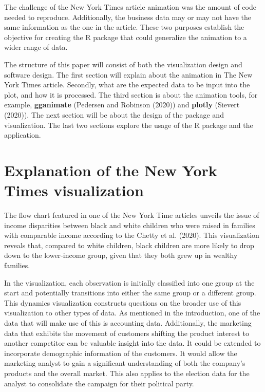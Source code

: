 The challenge of the New York Times article animation was the amount of code needed to reproduce. Additionally, the business data may or may not have the same information as the one in the article. These two purposes establish the objective for creating the R package that could generalize the animation to a wider range of data.

The structure of this paper will consist of both the visualization design and software design. The first section will explain about the animation in The New York Times article. Secondly, what are the expected data to be input into the plot, and how it is processed. The third section is about the animation tools, for example, \textbf{gganimate} (Pedersen and Robinson (2020)) and \textbf{plotly} (Sievert (2020)). The next section will be about the design of the package and visualization. The last two sections explore the usage of the R package and the application.

\hypertarget{explanation-of-the-new-york-times-visualization}{%
\section{Explanation of the New York Times visualization}\label{explanation-of-the-new-york-times-visualization}}

The flow chart featured in one of the New York Time articles unveils the issue of income disparities between black and white children who were raised in families with comparable income according to the Chetty et al. (2020). This visualization reveals that, compared to white children, black children are more likely to drop down to the lower-income group, given that they both grew up in wealthy families.

In the visualization, each observation is initially classified into one group at the start and potentially transitions into either the same group or a different group. This dynamics visualization constructs questions on the broader use of this visualization to other types of data. As mentioned in the introduction, one of the data that will make use of this is accounting data. Additionally, the marketing data that exhibits the movement of customers shifting the product interest to another competitor can be valuable insight into the data. It could be extended to incorporate demographic information of the customers. It would allow the marketing analyst to gain a significant understanding of both the company's products and the overall market. This also applies to the election data for the analyst to consolidate the campaign for their political party.

